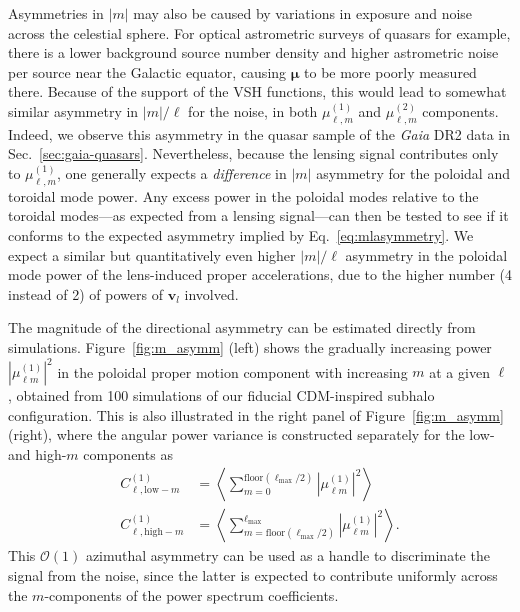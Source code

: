 \documentclass[prd,aps,10pt,nofootinbib,twocolumn,superscriptaddress,preprintnumbers,balancelastpage,longbibliography]{revtex4-1}
\newcommand{\vect}[1]{\boldsymbol{\mathbf{#1}}}
\newcommand{\ellm}{{\ell m}}
\newcommand{\red}[1]{\textcolor{deepred}{\bf #1}}
\newcommand{\edit}{\red{---edited up to here---}}
\begin{document}
Asymmetries in $|m|$ may also be caused by variations in exposure and noise across the celestial sphere. For optical astrometric surveys of quasars for example, there is a lower background source number density and higher astrometric noise per source near the Galactic equator, causing $\vect{\mu}$ to be more poorly measured there. Because of the support of the VSH functions, this would lead to somewhat similar asymmetry in $|m|/\ell$ for the noise, in both $\mu_{\ell,m}^{(1)}$ and $\mu_{\ell,m}^{(2)}$ components. Indeed, we observe this asymmetry in the quasar sample of the \textit{Gaia} DR2 data in Sec.~\ref{sec:gaia-quasars}. Nevertheless, because the lensing signal contributes only to $\mu_{\ell,m}^{(1)}$, one generally expects a \emph{difference} in $|m|$ asymmetry for the poloidal and toroidal mode power. Any excess power in the poloidal modes relative to the toroidal modes---as expected from a lensing signal---can then be tested to see if it conforms to the expected asymmetry implied by Eq.~\ref{eq:mlasymmetry}. We expect a similar but quantitatively even higher $|m|/\ell$ asymmetry in the poloidal mode power of the lens-induced proper accelerations, due to the higher number (4 instead of 2) of powers of $\vect{v}_l$ involved.




The magnitude of the directional asymmetry can be estimated directly from simulations. Figure~\ref{fig:m_asymm} (left) shows the gradually increasing power $|\mu^{(1)}_\ellm|^2$ in the poloidal proper motion component with increasing $m$ at a given $\ell$, obtained from 100 simulations of our fiducial CDM-inspired subhalo configuration. This is also illustrated in the right panel of Figure~\ref{fig:m_asymm} (right), where the angular power variance is constructed separately for the low- and high-$m$ components as 
\begin{align}
 C_{\ell,\mathrm{low-}m}^{(1)} &=  \left\langle \sum_{m = 0}^{\mathrm{floor}(\ell_\mathrm{max}/2)} \left| \mu_{\ell m}^{(1)} \right|^2\right\rangle \nonumber \\
 C_{\ell,\mathrm{high-}m}^{(1)} &= \left\langle\sum_{m = {\mathrm{floor}(\ell_\mathrm{max}/2)}}^{\ell_\mathrm{max}} \left| \mu_{\ell m}^{(1)} \right|^2\right\rangle. \label{eq:asymm}
\end{align}
This $\mathcal{O}(1)$ azimuthal asymmetry can be used as a handle to discriminate the signal from the noise, since the latter is expected to contribute uniformly across the $m$-components of the power spectrum coefficients.
\end{document}
